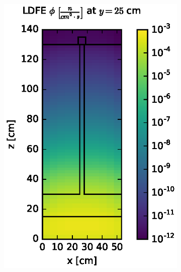 \documentclass{article} %
\begin{document}
\begin{figure}[!htb]
\begin{subfigure}{0.4\textwidth}
\includegraphics[max height=0.445\textheight]
{steel-fwd-flux-ldfe01.eps}
\end{subfigure} ~
\begin{subfigure}{0.4\textwidth}

\end{subfigure}
\end{figure}
\end{document}
